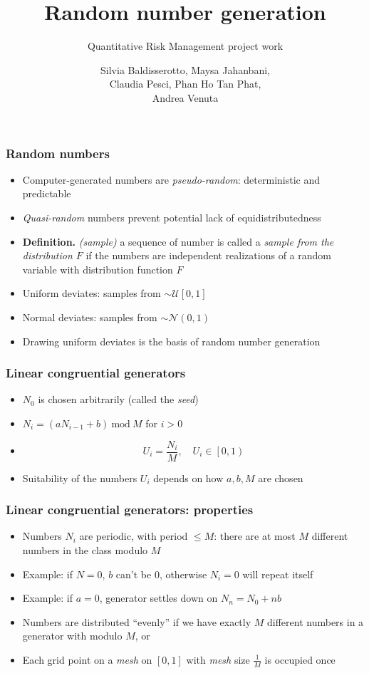 \documentclass[10pt, compress]{beamer}
\title{Random number generation}
\subtitle{Quantitative Risk Management project work}
\date{}
\author{Silvia Baldisserotto, Maysa Jahanbani, \\ Claudia Pesci, Phan Ho Tan Phat, \\ Andrea Venuta}
\institute{Università degli Studi di Firenze - Finance and Risk Management}
\begin{document}
\maketitle

\begin{frame}[fragile]
  \frametitle{Random numbers}
  \begin{itemize}
  	\item Computer-generated numbers are \textit{pseudo-random}: deterministic and predictable
  	\item \textit{Quasi-random} numbers prevent potential lack of equidistributedness
  	\item \textbf{Definition.} \textit{(sample)} a sequence of number is called a \textit{sample from the distribution $F$}
  	  if the numbers are independent realizations of a random variable with distribution function $F$
	\item Uniform deviates: samples from $\sim \mathcal{U}  \left[ 0, 1 \right] $
	\item Normal deviates: samples from $\sim \mathcal{N}  \left( 0, 1 \right) $
	\item Drawing uniform deviates is the basis of random number generation
  \end{itemize}
\end{frame}

\begin{frame}[fragile]
  \frametitle{Linear congruential generators}
  	\begin{itemize}
  	  \item $N_0$ is chosen arbitrarily (called the \textit{seed})
  	  \item $N_i = (aN_{i-1} + b)\ \text{mod}\ M$ for $i > 0$
  	  \item \[U_i = \frac{N_i}{M},\quad U_i \in \left[0,1\right)\]
  	  \item Suitability of the numbers $U_i$ depends on how $a, b, M$ are chosen
  	\end{itemize}
\end{frame}

\begin{frame}[fragile]
  \frametitle{Linear congruential generators: properties}
  \begin{itemize}
    \item Numbers $N_i$ are periodic, with period $\leq M$: there are at most $M$ different numbers in the class modulo $M$
    \item Example: if $N=0$, $b$ can't be $0$, otherwise $N_i = 0$ will repeat itself
    \item Example: if $a=0$, generator settles down on $N_n = N_0 + nb$
    \item Numbers are distributed ``evenly'' if we have exactly $M$ different numbers in a generator with modulo $M$, or
    \item Each grid point on a \textit{mesh} on $\left[0,1\right]$ with \textit{mesh} size $\frac{1}{M}$ is occupied once
  \end{itemize}
\end{frame}
\end{document}
